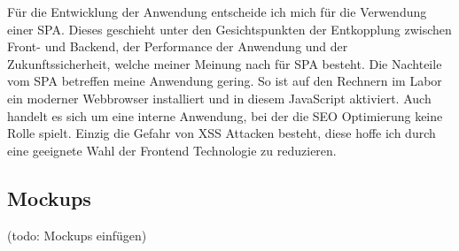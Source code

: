 Für die Entwicklung der Anwendung entscheide ich mich für die Verwendung einer SPA. Dieses geschieht unter den Gesichtspunkten der Entkopplung zwischen Front- und Backend, der Performance der Anwendung und der Zukunftssicherheit, welche meiner Meinung nach für SPA besteht. Die Nachteile vom SPA betreffen meine Anwendung gering. So ist auf den Rechnern im Labor ein moderner Webbrowser installiert und in diesem JavaScript aktiviert. Auch handelt es sich um eine interne Anwendung, bei der die SEO Optimierung keine Rolle spielt. Einzig die Gefahr von XSS Attacken besteht, diese hoffe ich durch eine geeignete Wahl der Frontend Technologie zu reduzieren.\cite{melnikSinglePageApplication2020}

\subsection{Mockups} \label{subsec:Mockup}
(todo: Mockups einfügen)